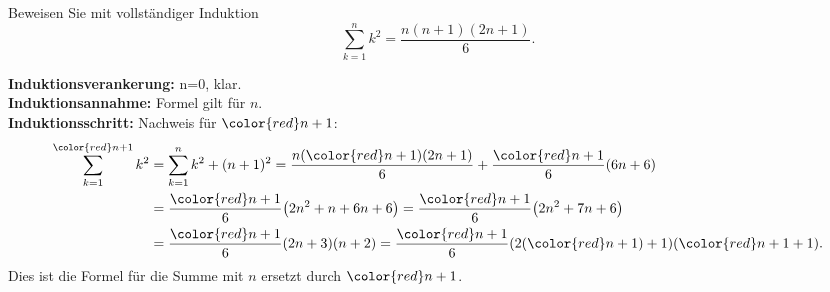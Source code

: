 Beweisen Sie mit vollständiger Induktion
\[
\sum_{k=1}^n k^2
=
\frac{n(n+1)(2n+1)}{6}.
\]

\begin{loesung}
{\bf Induktionsverankerung:} n=0, klar.
\\
{\bf Induktionsannahme:} Formel gilt für $n$.
\\
{\bf Induktionsschritt:} Nachweis für $\color{red}n+1$:
\begin{align*}
\sum_{k=1}^{{\color{red}n+1}} k^2
&=
\sum_{k=1}^n k^2
+
(n+1)^2
=
\frac{n({\color{red}n+1})(2n+1)}{6}+\frac{{\color{red}n+1}}{6}(6n+6)
\\
&
=
\frac{{\color{red}n+1}}{6}\bigl(
2n^2+n+6n+6
\bigr)
=
\frac{{\color{red}n+1}}{6}\bigl(
2n^2+7n+6
\bigr)
\\
&=
\frac{{\color{red}n+1}}{6}
(2n+3)(n+2)
=
\frac{{\color{red}n+1}}{6}(2({\color{red}n+1})+1)({\color{red}n+1}+1).
\end{align*}
Dies ist die Formel für die Summe mit $n$ ersetzt durch $\color{red}n+1$.
\end{loesung}
